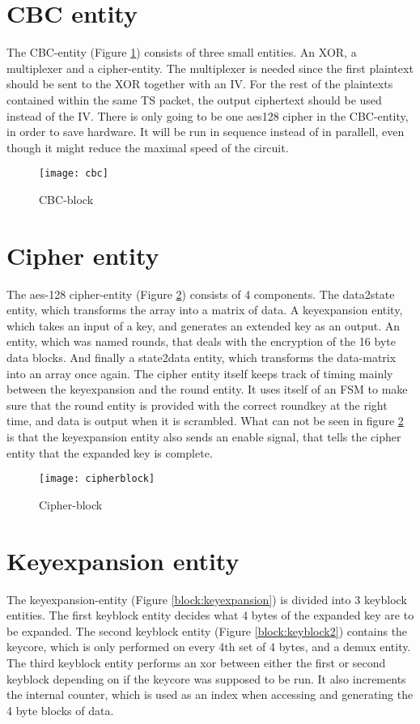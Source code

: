 \section{CBC entity}
The CBC-entity (Figure \ref{block:cbc}) consists of three small 
entities. An XOR, a multiplexer and a cipher-entity. The multiplexer is 
needed since the first plaintext should be sent to the XOR together 
with an IV. For the rest of the plaintexts contained within the same 
TS packet, the output ciphertext should be used instead of the IV. 
There is only going to be one aes128 cipher in the CBC-entity, in order 
to save hardware. It will be run in sequence instead of in parallell, 
even though it might reduce the maximal speed of the circuit.

\begin{figure}[h!]
  \centering
  \texttt{[image: cbc]}
  \caption{CBC-block}
  \label{block:cbc}
\end{figure}

\section{Cipher entity}
The aes-128 cipher-entity (Figure \ref{block:cipher}) consists of 4 
components. The data2state entity, which transforms the array into a 
matrix of data. A keyexpansion entity, which takes an input of a key, 
and generates an extended key as an output. An entity, which was named  
rounds, that deals with the encryption of the 16 byte data blocks. 
And finally a state2data entity, which transforms the data-matrix into 
an array once again. The cipher entity itself keeps track of timing 
mainly between the keyexpansion and the round entity. It uses itself of 
an FSM to make sure that the round entity is provided with the correct 
roundkey at the right time, and data is output when it is scrambled. 
What can not be seen in figure \ref{block:cipher} is that the 
keyexpansion entity also sends an enable signal, that tells the cipher 
entity that the expanded key is complete.

\begin{figure}[h!]
  \centering
  \texttt{[image: cipherblock]}
  \caption{Cipher-block}
  \label{block:cipher}
\end{figure}

\section{Keyexpansion entity}
The keyexpansion-entity (Figure \ref{block:keyexpansion}) is divided 
into 3 keyblock entities. The first keyblock entity decides what 4 
bytes of the expanded key are to be expanded. The second keyblock 
entity (Figure \ref{block:keyblock2}) contains the keycore, which is 
only performed on every 4th set of 4 bytes, and a demux entity. 
The third keyblock entity performs an xor between either the first or 
second keyblock depending on if the keycore was supposed to be run. It 
also increments the internal counter, which is used as an index when 
accessing and generating the 4 byte blocks of data.

